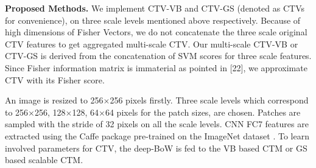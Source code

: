 \documentclass[journal]{IEEEtran}
\begin{document}
\textbf{Proposed Methods.} We implement CTV-VB and CTV-GS (denoted as CTVs for convenience), on three scale levels mentioned above respectively. Because of high dimensions of Fisher Vectors, we do not concatenate the three scale original CTV features to get aggregated multi-scale CTV. Our multi-scale CTV-VB or CTV-GS is derived from the concatenation of SVM scores for three scale features. Since Fisher information matrix is immaterial as pointed in [22], we approximate CTV with its Fisher score.

An image is resized to 256$\times$256 pixels firstly. Three scale levels which correspond to 256$\times$256, 128$\times$128, 64$\times$64 pixels for the patch sizes, are chosen. Patches are sampled with the stride of 32 pixels on all the scale levels. CNN FC7 features are extracted using the Caffe package \cite{jia2014caffe} pre-trained on the ImageNet dataset \cite{deng2009imagenet}. To learn involved parameters for CTV, the deep-BoW is fed to the VB based CTM or GS based scalable CTM.
\end{document}
